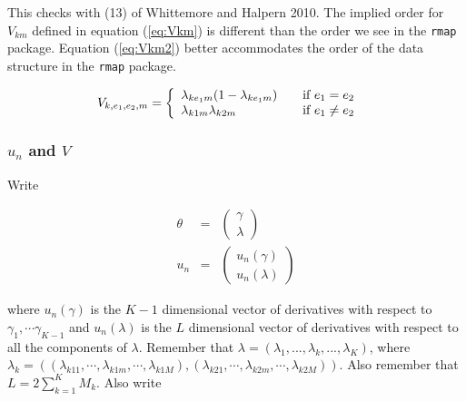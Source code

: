 \documentclass[11pt]{article}
\begin{document}
This checks with (13) of Whittemore and Halpern 2010.  The implied
order for $V_{km}$ defined in equation (\ref{eq:Vkm}) is different
than the order we see in the \texttt{rmap} package.  Equation 
(\ref{eq:Vkm2}) better accommodates the order of the data structure in the \texttt{rmap}
package.

\begin{align}
V_{k, e_1, e_2, m} & = \left\{
                             \begin{array}{l l}
                                 \lambda_{ke_1m}(1-\lambda_{ke_1m}) & \quad \text{if $e_1 = e_2$}\\
                                 \lambda_{k1m} \lambda_{k2m} & \quad \text{if $e_1 \neq e_2$}\\
                             \end{array} 
                           \right.  \label{eq:Vkm2}
\end{align}

\subsubsection{$u_n$ and $V$}

Write

\begin{eqnarray}
\theta & = & 
               \left( 
               \begin{array}{c}
                   \gamma\\
                   \lambda
               \end{array}
             \right) \\
u_n & = & 
              \left( 
             \begin{array}{c}
                  u_n(\gamma)\\
                  u_n(\lambda)
              \end{array}
            \right)
\end{eqnarray}

where $u_n(\gamma)$ is the $K-1$ dimensional vector of derivatives
with respect to $\gamma_1, \cdots \gamma_{K-1}$ and $u_n(\lambda)$ is the 
$L$
dimensional vector of derivatives with respect to all the components
of $\lambda$.
Remember that $\lambda = (\lambda_1, ..., \lambda_k, ..., \lambda_K)$, where
$\lambda_k =
      ((\lambda_{k11}, \cdots, \lambda_{k1m}, \cdots, \lambda_{k1M}),
               (\lambda_{k21}, \cdots, \lambda_{k2m}, \cdots,
               \lambda_{k2M}))$. Also remember that $L = 2 \sum_{k=1}^K{M_k}$.
Also write
\end{document}
